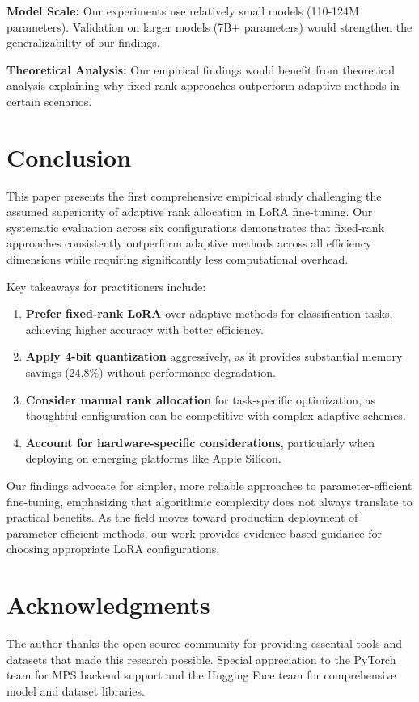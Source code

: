 \documentclass[11pt,a4paper]{article}
\begin{document}
\textbf{Model Scale:} Our experiments use relatively small models (110-124M parameters). Validation on larger models (7B+ parameters) would strengthen the generalizability of our findings.

\textbf{Theoretical Analysis:} Our empirical findings would benefit from theoretical analysis explaining why fixed-rank approaches outperform adaptive methods in certain scenarios.

\section{Conclusion}

This paper presents the first comprehensive empirical study challenging the assumed superiority of adaptive rank allocation in LoRA fine-tuning. Our systematic evaluation across six configurations demonstrates that fixed-rank approaches consistently outperform adaptive methods across all efficiency dimensions while requiring significantly less computational overhead.

Key takeaways for practitioners include:

\begin{enumerate}
    \item \textbf{Prefer fixed-rank LoRA} over adaptive methods for classification tasks, achieving higher accuracy with better efficiency.
    
    \item \textbf{Apply 4-bit quantization} aggressively, as it provides substantial memory savings (24.8\%) without performance degradation.
    
    \item \textbf{Consider manual rank allocation} for task-specific optimization, as thoughtful configuration can be competitive with complex adaptive schemes.
    
    \item \textbf{Account for hardware-specific considerations}, particularly when deploying on emerging platforms like Apple Silicon.
\end{enumerate}

Our findings advocate for simpler, more reliable approaches to parameter-efficient fine-tuning, emphasizing that algorithmic complexity does not always translate to practical benefits. As the field moves toward production deployment of parameter-efficient methods, our work provides evidence-based guidance for choosing appropriate LoRA configurations.

\section*{Acknowledgments}

The author thanks the open-source community for providing essential tools and datasets that made this research possible. Special appreciation to the PyTorch team for MPS backend support and the Hugging Face team for comprehensive model and dataset libraries.



\end{document}
